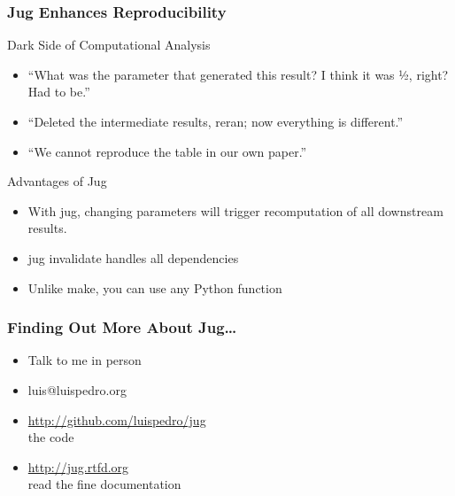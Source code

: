 \documentclass{beamer}
\begin{document}
\begin{frame}[fragile]
\frametitle{Jug Enhances Reproducibility}

\begin{block}{\alert{Dark Side} of Computational Analysis}
\begin{itemize}
\item ``What was the parameter that generated this result? I think it was ½, right? Had to be.''
\item ``Deleted the intermediate results, reran; now everything is different.''
\item ``We cannot reproduce the table in our own paper.''
\end{itemize}
\end{block}

\begin{block}{Advantages of Jug}


\begin{itemize}
\item With jug, changing parameters \alert{will trigger recomputation of all
downstream results}.
\item \alert{jug invalidate} handles all dependencies
\item Unlike \alert{make}, you can use any Python function
\end{itemize}

\end{block}

\end{frame}

\begin{frame}[fragile]
\frametitle{Finding Out More About Jug\ldots}
\begin{itemize}
\item Talk to me \alert{in person}
\item luis@luispedro.org
\item \url{http://github.com/luispedro/jug}\\the code
\item \url{http://jug.rtfd.org}\\read the fine documentation
\end{itemize}

\end{frame}
\end{document}
